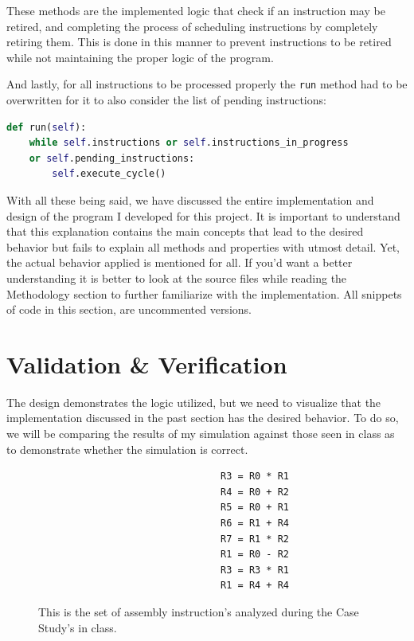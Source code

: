 \documentclass{article}
\begin{document}
These methods are the implemented logic that check if an instruction may be retired, and completing the process of scheduling instructions by completely retiring them. This is done in this manner to prevent instructions to be retired while not maintaining the proper logic of the program.

And lastly, for all instructions to be processed properly the \lstinline|run| method had to be overwritten for it to also consider the list of pending instructions:
\begin{lstlisting}[language=Python]
 def run(self):
    while self.instructions or self.instructions_in_progress 
    or self.pending_instructions:
        self.execute_cycle()
\end{lstlisting}

With all these being said, we have discussed the entire implementation and design of the program I developed for this project. It is important to understand that this explanation contains the main concepts that lead to the desired behavior but fails to explain all methods and properties with utmost detail. Yet, the actual behavior applied is mentioned for all. If you'd want a better understanding it is better to look at the source files while reading the Methodology section to further familiarize with the implementation. All snippets of code in this section, are uncommented versions.

\section{Validation \& Verification}
The design demonstrates the logic utilized, but we need to visualize that the implementation discussed in the past section has the desired behavior. To do so, we will be comparing the results of my simulation against those seen in class as to demonstrate whether the simulation is correct. 

\begin{figure}[H]
    \begin{lstlisting}
                                R3 = R0 * R1
                                R4 = R0 + R2
                                R5 = R0 + R1
                                R6 = R1 + R4
                                R7 = R1 * R2
                                R1 = R0 - R2
                                R3 = R3 * R1
                                R1 = R4 + R4  
    \end{lstlisting}
    \caption{This is the set of assembly instruction's analyzed during the Case Study's in class.}
    \label{fig:CaseStudyAssembly}
\end{figure}
\end{document}
